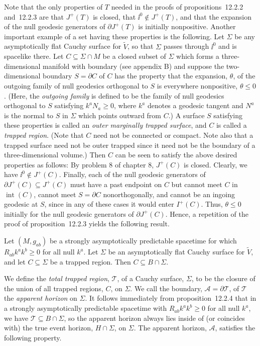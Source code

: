 Note that the only properties of \(T\) needed in the proofs of
propositions~12.2.2 and~12.2.3 are that \(J^+(T)\) is closed, that
\(\ii^0\notin J^+(T)\), and that the expansion of the null geodesic generators of
\(\partial J^+(T)\) is initially nonpositive. Another important example of a set
having these properties is the following. Let \(\Sigma\) be any asymptotically flat
Cauchy surface for \(\widetilde V\), so that \(\Sigma\) passes through \(\ii^0\) and is
spacelike there. Let \(C\subseteq\Sigma\cap M\) be a closed subset of \(\Sigma\)
which forms a three-dimensional manifold with boundary (see appendix B) and
suppose the two-dimensional boundary \(S=\partial C\) of \(C\) has the property
that the expansion, \(\theta\), of the outgoing family of null geodesics orthogonal to
\(S\) is everywhere nonpositive, \(\theta\le0\). (Here, the \emph{outgoing family}
is defined to be the family of null geodesics orthogonal to \(S\) satisfying
\(k^aN_a\ge0\), where \(k^a\) denotes a geodesic tangent and \(N^a\) is the normal
to \(S\) in \(\Sigma\) which points outward from \(C\).) A surface \(S\) satisfying
these properties is called an \emph{outer marginally trapped surface}, and \(C\) is
called a \emph{trapped region}. (Note that \(C\) need not be connected or compact.
Note also that a trapped surface need not be outer trapped since it need not be the
boundary of a three-dimensional volume.) Then \(C\) can be seen to satisfy the above
desired properties as follows: By problem 8 of chapter 8, \(J^+(C)\) is closed.
Clearly, we have \(\ii^0\notin J^+(C)\). Finally, each of the null geodesic generators
of \(\partial J^+(C)\subseteq J^+(C)\) must have a past endpoint on \(C\) but
cannot meet \(C\) in \(\operatorname{int}(C)\), cannot meet \(S=\partial C\)
nonorthogonally, and cannot be an ingoing geodesic at \(S\), since in any of these
cases it would enter \(I^+(C)\). Thus, \(\theta\le0\) initially for the null geodesic
generators of \(\partial J^+(C)\). Hence, a repetition of the proof of
proposition~12.2.3 yields the following result.

\begin{proposition}\label{prop:12.2.4}
Let \((M,g_{ab})\) be a strongly asymptotically predictable spacetime for which
\(R_{ab}k^ak^b\ge0\) for all null \(k^a\). Let \(\Sigma\) be an asymptotically flat
Cauchy surface for \(\widetilde V\), and let \(C\subseteq\Sigma\) be a trapped
region. Then \(C\subseteq B\cap\Sigma\).
\end{proposition}

We define the \emph{total trapped region}, \(\mathcal T\), of a Cauchy surface,
\(\Sigma\), to be the closure of the union of all trapped regions, \(C\), on
\(\Sigma\). We call the boundary, \(\mathcal A=\partial\mathcal T\), of
\(\mathcal T\) the \emph{apparent horizon} on \(\Sigma\). It follows immediately
from proposition~12.2.4 that in a strongly asymptotically predictable spacetime with
\(R_{ab}k^ak^b\ge0\) for all null \(k^a\), we have
\(\mathcal T\subseteq B\cap\Sigma\), so the apparent horizon always lies inside of
(or coincides with) the true event horizon, \(H\cap\Sigma\), on \(\Sigma\). The
apparent horizon, \(\mathcal A\), satisfies the following property.

